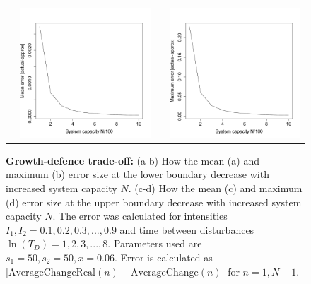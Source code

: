 \begin{figure}[th]
\begin{tabular}{rrrr}
  &\includegraphics[width=2.5in]{GDtmeanerr.pdf} && \includegraphics[width=2.5in]{GDtmaxerr.pdf} \end{tabular}
   \caption[Errors in approximating average change: growth-defence trade-off]{\textbf{Growth-defence trade-off:} (a-b)  How the mean (a) and maximum (b)  error size at the lower boundary decrease with increased system capacity $N$. (c-d) How the mean (c) and maximum (d) error size at the upper boundary decrease with increased system capacity $N$. The error was calculated for intensities $I_1,I_2=0.1,0.2,0.3,...,0.9$ and time between disturbances $\ln(T_D)=1,2,3,...,8.$ Parameters used are $s_1=50,s_2=50,x=0.06$. Error is calculated as $| \text{AverageChangeReal}(n) - \text{AverageChange}(n) |$ for $n=1,N-1$.}
     \label{fig:growthdefenceerrors}
    \end{figure}
    
